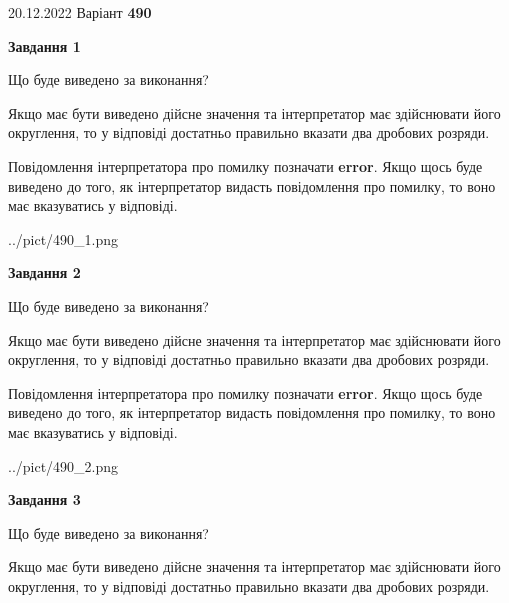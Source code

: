 \documentclass[12pt, ukrainian]{article}
\begin{document}
{20.12.2022 Варіант \No \textbf { 490 }\par}
{
\begin {Large}

{\begin {center}\textbf{Завдання 1}\end {center}}\par
Що буде виведено за виконання? \par

Якщо має бути виведено дійсне значення та інтерпретатор має здійснювати його округлення, 
то у відповіді достатньо правильно вказати два дробових розряди.

Повідомлення інтерпретатора про помилку позначати \textbf{error}.
Якщо щось буде виведено до того, як інтерпретатор видасть повідомлення про помилку, 
то воно має вказуватись у відповіді. \par

\begin{center}
	{../pict/490_1.png}
\end{center}
\newpage

{\begin {center}\textbf{Завдання 2}\end {center}}\par
Що буде виведено за виконання? \par

Якщо має бути виведено дійсне значення та інтерпретатор має здійснювати його округлення, 
то у відповіді достатньо правильно вказати два дробових розряди.

Повідомлення інтерпретатора про помилку позначати \textbf{error}.
Якщо щось буде виведено до того, як інтерпретатор видасть повідомлення про помилку, 
то воно має вказуватись у відповіді. \par

\begin{center}
	{../pict/490_2.png}
\end{center}
\newpage

{\begin {center}\textbf{Завдання 3}\end {center}}\par
Що буде виведено за виконання? \par

Якщо має бути виведено дійсне значення та інтерпретатор має здійснювати його округлення, 
то у відповіді достатньо правильно вказати два дробових розряди.


\end{Large}}
\end{document}
